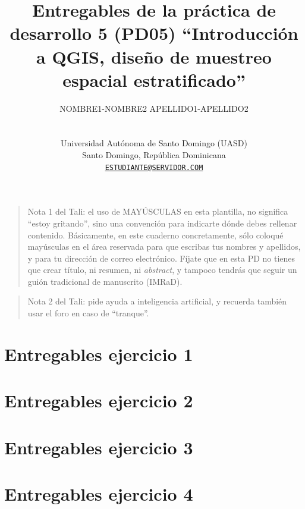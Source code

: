 \documentclass[spanish]{article}
\title{Entregables de la práctica de desarrollo 5 (PD05) ``Introducción
a QGIS, diseño de muestreo espacial estratificado''}
\author{
    \parbox[t]{10cm}{\centering NOMBRE1-NOMBRE2 APELLIDO1-APELLIDO2 \\ \orcidlink{CÓDIGO ORCID}}
   \\
    Universidad Autónoma de Santo Domingo (UASD) \\
  Santo Domingo, República Dominicana \\
  \texttt{\href{mailto:ESTUDIANTE@SERVIDOR.COM}{\nolinkurl{ESTUDIANTE@SERVIDOR.COM}}} \\
  }
\begin{document}
\maketitle


\begin{resumen}

\end{resumen}



\begin{abstract}

\end{abstract}


\begin{quote}
Nota 1 del Tali: el uso de MAYÚSCULAS en esta plantilla, no significa
``estoy gritando'', sino una convención para indicarte dónde debes
rellenar contenido. Básicamente, en este cuaderno concretamente, sólo
coloqué mayúsculas en el área reservada para que escribas tus nombres y
apellidos, y para tu dirección de correo electrónico. Fíjate que en esta
PD no tienes que crear título, ni resumen, ni \emph{abstract}, y tampoco
tendrás que seguir un guión tradicional de manuscrito (IMRaD).
\end{quote}

\begin{quote}
Nota 2 del Tali: pide ayuda a inteligencia artificial, y recuerda
también usar el foro en caso de ``tranque''.
\end{quote}

\section{Entregables ejercicio 1}\label{entregables-ejercicio-1}

\section{Entregables ejercicio 2}\label{entregables-ejercicio-2}

\section{Entregables ejercicio 3}\label{entregables-ejercicio-3}

\section{Entregables ejercicio 4}\label{entregables-ejercicio-4}
\end{document}
